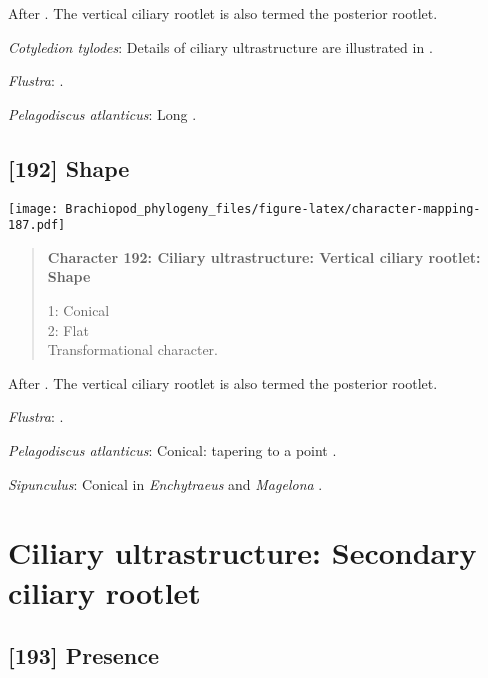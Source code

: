 \documentclass[openany]{book}
\theoremstyle{definition}
\theoremstyle{definition}
\theoremstyle{definition}
\theoremstyle{remark}
\begin{document}
After \citet{Lundin2009}. The vertical ciliary rootlet is also termed
the posterior rootlet.

\hypertarget{Cotyledion_tylodes-coding-191}{}
\emph{Cotyledion tylodes}: Details of ciliary ultrastructure are
illustrated in \citet{Nielsen1976}.

\hypertarget{Flustra-coding-191}{}
\emph{Flustra}: \citet{Reed1982}.

\hypertarget{Pelagodiscus_atlanticus-coding-191}{}
\emph{Pelagodiscus atlanticus}: Long \citep{Luter1995}.

\subsection*{{[}192{]} Shape}\label{shape}

\texttt{[image: Brachiopod\_phylogeny\_files/figure-latex/character-mapping-187.pdf]}

\begin{quote}
\textbf{Character 192: Ciliary ultrastructure: Vertical ciliary rootlet:
Shape}

1: Conical\\
2: Flat\\
Transformational character.
\end{quote}

After \citet{Lundin2009}. The vertical ciliary rootlet is also termed
the posterior rootlet.

\hypertarget{Flustra-coding-192}{}
\emph{Flustra}: \citet{Reed1982}.

\hypertarget{Pelagodiscus_atlanticus-coding-192}{}
\emph{Pelagodiscus atlanticus}: Conical: tapering to a point
\citep{Luter1995}.

\hypertarget{Sipunculus-coding-192}{}
\emph{Sipunculus}: Conical in \emph{Enchytraeus} \citep{Reger1967} and
\emph{Magelona} \citep{Bartolomaeus1995}.

\section{Ciliary ultrastructure: Secondary ciliary
rootlet}\label{ciliary-ultrastructure-secondary-ciliary-rootlet}

\subsection*{{[}193{]} Presence}\label{presence-4}
\end{document}
